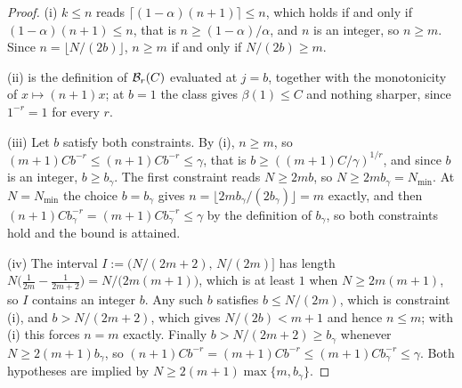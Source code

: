 \documentclass[../../../main.tex]{subfiles}
\begin{document}
\begin{proof}
(i) $k\le n$ reads $\lceil(1-\alpha)(n+1)\rceil\le n$, which holds if and only if $(1-\alpha)(n+1)\le n$, that is $n\ge(1-\alpha)/\alpha$, and $n$ is an integer, so $n\ge m$. Since $n=\lfloor N/(2b)\rfloor$, $n\ge m$ if and only if $N/(2b)\ge m$.

(ii) is the definition of $\mathcal B_{r}(C)$ evaluated at $j=b$, together with the monotonicity of $x\mapsto(n+1)x$; at $b=1$ the class gives $\beta(1)\le C$ and nothing sharper, since $1^{-r}=1$ for every $r$.

(iii) Let $b$ satisfy both constraints. By (i), $n\ge m$, so $(m+1)Cb^{-r}\le(n+1)Cb^{-r}\le\gamma$, that is $b\ge((m+1)C/\gamma)^{1/r}$, and since $b$ is an integer, $b\ge b_\gamma$. The first constraint reads $N\ge2mb$, so $N\ge2mb_\gamma=N_{\min}$. At $N=N_{\min}$ the choice $b=b_\gamma$ gives $n=\lfloor 2mb_\gamma/(2b_\gamma)\rfloor=m$ exactly, and then $(n+1)Cb_\gamma^{-r}=(m+1)Cb_\gamma^{-r}\le\gamma$ by the definition of $b_\gamma$, so both constraints hold and the bound is attained.

(iv) The interval $I:=\big(N/(2m+2),\,N/(2m)\big]$ has length $N\big(\tfrac1{2m}-\tfrac1{2m+2}\big)=N/\big(2m(m+1)\big)$, which is at least $1$ when $N\ge2m(m+1)$, so $I$ contains an integer $b$. Any such $b$ satisfies $b\le N/(2m)$, which is constraint (i), and $b>N/(2m+2)$, which gives $N/(2b)<m+1$ and hence $n\le m$; with (i) this forces $n=m$ exactly. Finally $b>N/(2m+2)\ge b_\gamma$ whenever $N\ge2(m+1)b_\gamma$, so $(n+1)Cb^{-r}=(m+1)Cb^{-r}\le(m+1)Cb_\gamma^{-r}\le\gamma$. Both hypotheses are implied by $N\ge2(m+1)\max\{m,b_\gamma\}$.
\end{proof}

\end{document}
